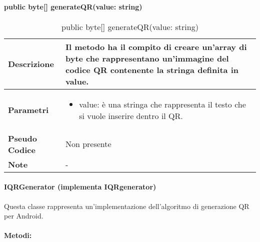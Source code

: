 \paragraph{public byte[] generateQR(value: string)}
\begin{center}
    \begin{longtable}{|p{3cm}|p{9cm}|}%
    \caption{public byte[] generateQR(value: string)}
    \endfirsthead
    \endhead
    \hline
    \textbf{Descrizione} & Il metodo ha il compito di creare un’array di byte che rappresentano un’immagine del codice QR contenente la stringa definita in value.\\
    \hline
    \textbf{Parametri} &      
    \begin{itemize}
        \item value: è una stringa che rappresenta il testo che si vuole inserire dentro il QR.
    \end{itemize}
    \\
    \hline
    \textbf{Pseudo Codice} & 
    Non presente
    \\
    \hline
    \textbf{Note} & 
    -
    \\
    \hline
    \end{longtable}
\end{center}

\paragraph{IQRGenerator (implementa IQRgenerator)}
Questa classe rappresenta un’implementazione dell’algoritmo di generazione QR per Android.
\paragraph{Metodi:}

